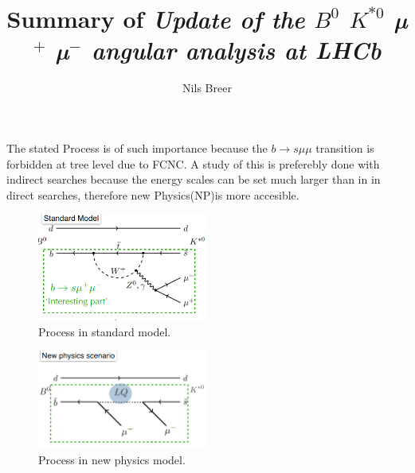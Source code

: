 


\setlength{\oddsidemargin}{0.0 cm}
\setlength{\evensidemargin}{0.0 cm}
\setlength{\topmargin}{-1cm}
\setlength{\textheight}{24 cm}
\setlength{\textwidth}{16 cm}

\pagestyle{plain}

\setlength{\parindent}{0in}



\author{Nils Breer}

\title{Summary of \textit{Update of the $B^0$ \to $K^{*0}$ µ$^{+}$ µ$^{-}$ angular analysis at LHCb}}

\maketitle
The stated Process is of such importance because the
$b \to s \mu \mu$ transition is forbidden at tree level due to FCNC.
A study of this is preferebly done with indirect searches because the energy scales can be set much larger than in in direct searches, therefore new Physics(NP)is more accesible.
\begin{figure}
  \centering
  \includegraphics[width=0.5\textwidth]{pictures/sm_flavordiagram.png}
  \caption{Process in standard model.}
  \label{fig:sm_process}
\end{figure}

\begin{figure}
  \centering
  \includegraphics[width=0.5\textwidth]{pictures/NP_flavordiagram.png}
  \caption{Process in new physics model.}
  \label{fig:np_process}
\end{figure}


